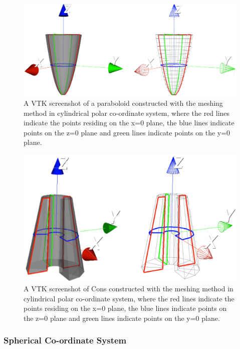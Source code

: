 \documentclass[12pt,a4paper]{article}
\begin{document}
\begin{figure}[h!]
\centering
\includegraphics[scale=0.3]{Images//Coords//para.png}
\caption[width=\columnwidth]{A VTK screenshot of a paraboloid constructed with the meshing method in cylindrical polar co-ordinate system, where the red lines indicate the points residing on the x=0 plane, the blue lines indicate points on the z=0 plane and green lines indicate points on the y=0 plane.}
\label{paraco}
\end{figure}

\begin{figure}[h!]
\centering
\includegraphics[scale=0.3]{Images//Coords//consco.png}
\caption[width=\columnwidth]{A VTK screenshot of Cons constructed with the meshing method in cylindrical polar co-ordinate system, where the red lines indicate the points residing on the x=0 plane, the blue lines indicate points on the z=0 plane and green lines indicate points on the y=0 plane.}
\label{consco}
\end{figure}


\subsubsection{Spherical Co-ordinate System}
\end{document}
